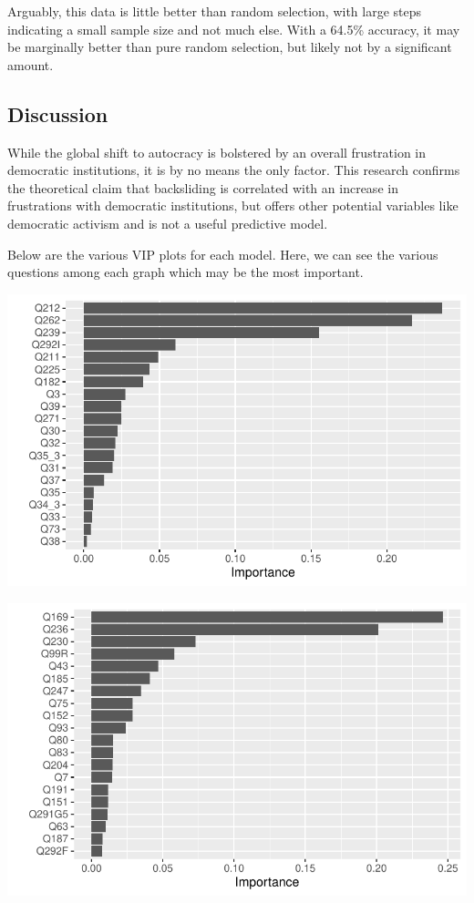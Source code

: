 \documentclass[
  letterpaper,
  DIV=11,
  numbers=noendperiod]{scrartcl}
\begin{document}
Arguably, this data is little better than random selection, with large
steps indicating a small sample size and not much else. With a 64.5\%
accuracy, it may be marginally better than pure random selection, but
likely not by a significant amount.

\subsection{Discussion}\label{discussion}

While the global shift to autocracy is bolstered by an overall
frustration in democratic institutions, it is by no means the only
factor. This research confirms the theoretical claim that backsliding is
correlated with an increase in frustrations with democratic
institutions, but offers other potential variables like democratic
activism and is not a useful predictive model.

Below are the various VIP plots for each model. Here, we can see the
various questions among each graph which may be the most important.

\includegraphics{Episode_2_files/figure-pdf/vip-1.pdf}

\includegraphics{Episode_2_files/figure-pdf/vip-2.pdf}
\end{document}
